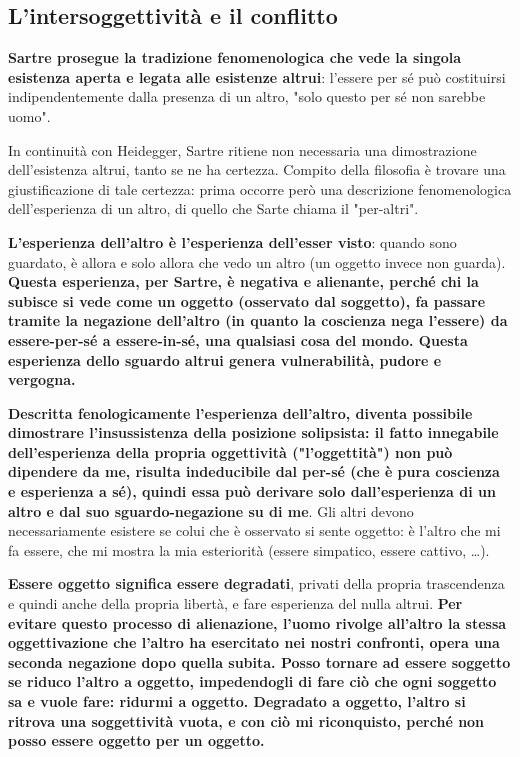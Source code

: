 \subsection{L'intersoggettività e il conflitto}

\textbf{Sartre prosegue la tradizione fenomenologica che vede la singola esistenza aperta e legata alle esistenze altrui}: l'essere per sé può costituirsi indipendentemente dalla presenza di un altro, "solo questo per sé non sarebbe uomo".

In continuità con Heidegger, Sartre ritiene non necessaria una dimostrazione dell'esistenza altrui, tanto se ne ha certezza.
Compito della filosofia è trovare una giustificazione di tale certezza: prima occorre però una descrizione fenomenologica dell'esperienza di un altro, di quello che Sarte chiama il "per-altri".

\textbf{L'esperienza dell'altro è l'esperienza dell'esser visto}: quando sono guardato, è allora e solo allora che vedo un altro (un oggetto invece non guarda). \textbf{Questa esperienza, per Sartre, è negativa e alienante, perché chi la subisce si vede come un oggetto (osservato dal soggetto), fa passare tramite la negazione dell'altro (in quanto la coscienza nega l'essere) da essere-per-sé a essere-in-sé, una qualsiasi cosa del mondo. Questa esperienza dello sguardo altrui genera vulnerabilità, pudore e vergogna.}

\textbf{Descritta fenologicamente l'esperienza dell'altro, diventa possibile dimostrare l'insussistenza della posizione solipsista: il fatto innegabile dell'esperienza della propria oggettività ("l'oggettità") non può dipendere da me, risulta indeducibile dal per-sé (che è pura coscienza e esperienza a sé), quindi essa può derivare solo dall'esperienza di un altro e dal suo sguardo-negazione su di me}. Gli altri devono necessariamente esistere se colui che è osservato si sente oggetto: è l'altro che mi fa essere, che mi mostra la mia esteriorità (essere simpatico, essere cattivo, \dots).

\textbf{Essere oggetto significa essere degradati}, privati della propria trascendenza e quindi anche della propria libertà, e fare esperienza del nulla altrui. \textbf{Per evitare questo processo di alienazione, l'uomo  rivolge all'altro la stessa oggettivazione che l'altro ha esercitato nei nostri confronti, opera una seconda negazione dopo quella subita. Posso tornare ad essere soggetto se riduco l'altro a oggetto, impedendogli di fare ciò che ogni soggetto sa e vuole fare: ridurmi a oggetto. Degradato a oggetto, l'altro si ritrova una soggettività vuota, e con ciò mi riconquisto, perché non posso essere oggetto per un oggetto.}

